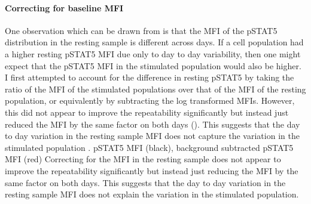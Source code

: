 \paragraph{ Correcting for baseline MFI }
One observation which can be drawn from  is that the
MFI of the pSTAT5 distribution in the resting sample is different across days.
If a cell population had a higher resting pSTAT5 MFI due only to day to day variability,
then one might expect that the pSTAT5 MFI in the stimulated population would also be higher.
I first attempted to account for the difference in resting pSTAT5 by
taking the ratio of the MFI of the stimulated populations over that of the MFI of the resting population,
or equivalently by subtracting the log transformed MFIs.
However, this did not appear to improve the repeatability significantly but instead just reduced the MFI by the same factor on both days
().
This suggests that the day to day variation in the resting sample MFI does not capture the variation in the stimulated population
.
{ pSTAT5 MFI (black), background subtracted pSTAT5 MFI (red) }
{
  Correcting for the MFI in the resting sample does not appear to improve the repeatability significantly but instead just reducing the MFI by
  the same factor on both days.
  This suggests that the day to day variation in the resting sample MFI does not explain the variation in the stimulated population.
}

\clearpage

